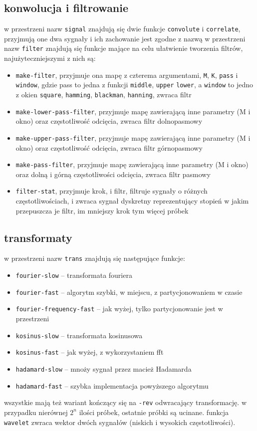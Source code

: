 \documentclass[12pt]{article}
\newcommand{\cljt}[1]{\texttt{#1}}
\begin{document}
\subsection{konwolucja i filtrowanie}
w przestrzeni nazw \cljt{signal} znajdują się dwie funkcje \cljt{convolute} i
\cljt{correlate}, przyjmują one dwa sygnały i ich zachowanie jest zgodne z nazwą
w przestrzeni nazw \cljt{filter} znajdują się funkcje mające na celu ułatwienie
tworzenia filtrów, najużyteczniejszymi z nich są:
\begin{itemize}
	\item \cljt{make-filter}, przyjmuje ona mapę z czterema argumentami, \cljt{M}, \cljt{K}, \cljt{pass}
	      i \cljt{window}, gdzie pass to jedna z funkcji \cljt{middle}, \cljt{upper}
	      \cljt{lower}, a \cljt{window} to jedno z okien \cljt{square},
	      \cljt{hamming}, \cljt{blackman}, \cljt{hanning}, zwraca filtr
	\item \cljt{make-lower-pass-filter}, przyjmuje mapę zawierającą inne parametry
	      (M i okno) oraz częstotliwość odcięcia, zwraca filtr dolnopasmowy
	\item \cljt{make-upper-pass-filter}, przyjmuje mapę zawierającą inne parametry
	      (M i okno) oraz częstotliwość odcięcia, zwraca filtr górnopasmowy
	\item \cljt{make-pass-filter}, przyjmuje mapę zawierającą inne parametry
	      (M i okno) oraz dolną i górną częstotliwości odcięcia, zwraca filtr pasmowy
	\item \cljt{filter-stat}, przyjmuje krok, i filtr, filtruje
	      sygnały o różnych częstotliwościach, i zwraca sygnał dyskretny
	      reprezentujący stopień w jakim przepuszcza je filtr, im mniejszy krok
	      tym więcej próbek
\end{itemize}
\subsection{transformaty}
w przestrzeni nazw \cljt{trans} znajdują się następujące funkcje:
\begin{itemize}
	\item \cljt{fourier-slow} -- transformata fouriera
	\item \cljt{fourier-fast} -- algorytm szybki, w miejscu, z partycjonowaniem w czasie
	\item \cljt{fourier-frequency-fast} -- jak wyżej, tylko partycjonowanie jest w przestrzeni
	\item \cljt{kosinus-slow} -- transformata kosinusowa
	\item \cljt{kosinus-fast} -- jak wyżej, z wykorzystaniem fft
	\item \cljt{hadamard-slow} -- mnoży sygnał przez macież Hadamarda
	\item \cljt{hadamard-fast} -- szybka implementacja powyższego algorytmu
\end{itemize}
wszystkie mają też wariant kończący się na \cljt{-rev} odwracający
transformację.
w przypadku nierównej $2^n$ ilości próbek, ostatnie próbki są ucinane.
funkcja \cljt{wavelet} zwraca wektor dwóch sygnałów (niskich i wysokich częstotliwości).
\end{document}
